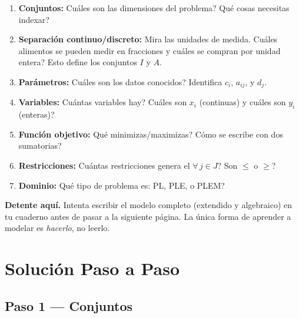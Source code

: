 \documentclass[12pt]{article}
\begin{document}
\begin{enumerate}[label=\textbf{P\arabic*.}]
    \item \textbf{Conjuntos:} \textquestiondown Cu\'ales son las dimensiones del problema? \textquestiondown Qu\'e cosas necesitas indexar?

    \item \textbf{Separaci\'on continuo/discreto:} Mira las unidades de medida. \textquestiondown Cu\'ales alimentos se pueden medir en fracciones y cu\'ales se compran por unidad entera? Esto define los conjuntos $I$ y $A$.

    \item \textbf{Par\'ametros:} \textquestiondown Cu\'ales son los datos conocidos? Identifica $c_i$, $a_{ij}$, y $d_j$.

    \item \textbf{Variables:} \textquestiondown Cu\'antas variables hay? \textquestiondown Cu\'ales son $x_i$ (continuas) y cu\'ales son $y_i$ (enteras)?

    \item \textbf{Funci\'on objetivo:} \textquestiondown Qu\'e minimizas/maximizas? \textquestiondown C\'omo se escribe con dos sumatorias?

    \item \textbf{Restricciones:} \textquestiondown Cu\'antas restricciones genera el $\forall\, j \in J$? \textquestiondown Son $\leq$ o $\geq$?

    \item \textbf{Dominio:} \textquestiondown Qu\'e tipo de problema es: PL, PLE, o PLEM?
\end{enumerate}

\begin{cajavioleta}
\textbf{Detente aqu\'i.} Intenta escribir el modelo completo (extendido y algebraico) en tu cuaderno antes de pasar a la siguiente p\'agina. La \'unica forma de aprender a modelar es \textit{hacerlo}, no leerlo.
\end{cajavioleta}

\newpage

\section{Soluci\'on Paso a Paso}

\subsection{Paso 1 --- Conjuntos}
\end{document}
